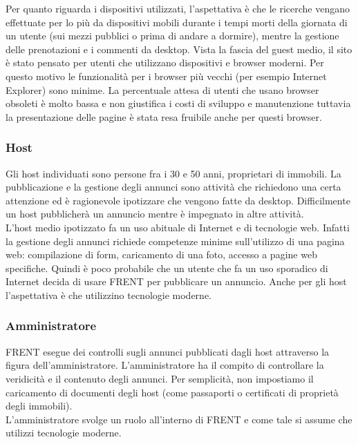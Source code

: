 \documentclass[1_relazione.tex]{subfiles}
\begin{document}
Per quanto riguarda i dispositivi utilizzati, l'aspettativa \`{e} che le ricerche vengano effettuate per lo pi\`{u} da dispositivi mobili durante i tempi morti della giornata di un utente (sui mezzi pubblici o prima di andare a dormire), mentre la gestione delle prenotazioni e i commenti da desktop.
Vista la fascia del guest medio, il sito \`{e} stato pensato per utenti che utilizzano dispositivi e browser moderni.
Per questo motivo le funzionalit\`{a} per i browser pi\`{u} vecchi (per esempio Internet Explorer) sono minime. La percentuale attesa di utenti che usano browser obsoleti \`{e} molto bassa e non giustifica i costi di sviluppo e manutenzione tuttavia la presentazione delle pagine \`{e} stata resa fruibile anche per questi browser.

\subsubsection{Host}
Gli host individuati sono persone fra i 30 e 50 anni, proprietari di immobili. La pubblicazione e la gestione degli annunci sono attivit\`{a} che richiedono una certa attenzione ed \`{e} ragionevole ipotizzare che vengono fatte da desktop. Difficilmente un host pubblicher\`{a} un annuncio mentre \`{e} impegnato in altre attivit\`{a}. \\
L'host medio ipotizzato fa un uso abituale di Internet e di tecnologie web. Infatti la gestione degli annunci richiede competenze minime sull'utilizzo di una pagina web: compilazione di form, caricamento di una foto, accesso a pagine web specifiche. Quindi \`{e} poco probabile che un utente che fa un uso sporadico di Internet decida di usare FRENT per pubblicare un annuncio.
Anche per gli host l'aspettativa \`{e} che utilizzino tecnologie moderne.


\subsubsection{Amministratore}
FRENT esegue dei controlli sugli annunci pubblicati dagli host attraverso la figura dell'amministratore. L'amministratore ha il compito di controllare la veridicit\`{a} e il contenuto degli annunci.  Per semplicit\`{a}, non impostiamo il caricamento di documenti degli host (come passaporti o certificati di propriet\`{a} degli immobili). \\
L'amministratore svolge un ruolo all'interno di FRENT e come tale si assume che utilizzi tecnologie moderne.   
\end{document}
